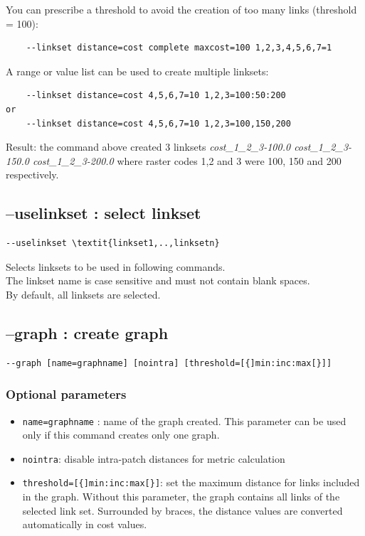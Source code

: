 \documentclass[a4paper,10pt]{report}
\begin{document}
You can prescribe a threshold to avoid the creation of too many links (threshold = 100):
\begin{Verbatim}
	--linkset distance=cost complete maxcost=100 1,2,3,4,5,6,7=1
\end{Verbatim}

A range or value list can be used to create multiple linksets:
\begin{Verbatim}
	--linkset distance=cost 4,5,6,7=10 1,2,3=100:50:200
or
	--linkset distance=cost 4,5,6,7=10 1,2,3=100,150,200
\end{Verbatim}
Result: the command above created 3 linksets \textit{cost\_1\_2\_3-100.0 cost\_1\_2\_3-150.0 cost\_1\_2\_3-200.0}
where raster codes 1,2 and 3 were 100, 150 and 200 respectively.

 

\subsection{--uselinkset : select linkset}
\label{uselinkset}
\begin{Verbatim}[commandchars=\\\{\}]
--uselinkset \textit{linkset1,..,linksetn}
\end{Verbatim}
Selects linksets to be used in following commands.\\
The linkset name is case sensitive and must not contain blank spaces.\\
By default, all linksets are selected.

\subsection{--graph : create graph}
\begin{Verbatim}
--graph [name=graphname] [nointra] [threshold=[{]min:inc:max[}]]
\end{Verbatim}

\subsubsection{Optional parameters}
\begin{itemize}
	\item \verb|name=graphname| : name of the graph created. This parameter can be used only if this command creates only one graph.
	\item \verb|nointra|: disable intra-patch distances for metric calculation
	\item \verb|threshold=[{]min:inc:max[}]|: set the maximum distance for links included in the graph. Without this parameter, the graph contains all links of the selected link set. Surrounded by braces, the distance values are converted automatically in cost values.
\end{itemize}
\end{document}
